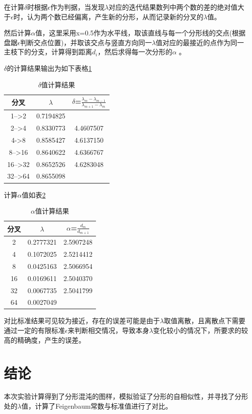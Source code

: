 \documentclass{article}
\begin{document}
	在计算$\delta$时根据$\epsilon$作为判据，当发现$\lambda$对应的迭代结果数列中两个数的差的绝对值大于$\epsilon$时，认为两个数已经偏离，产生新的分形，从而记录新的分叉的$\lambda$值。
	
	
	然后计算$\alpha$值，这里采用x=0.5作为水平线，取该直线与每一个分形线的交点(根据盘踞$ \epsilon $判断交点位置)，并取该交点与竖直方向同一$\lambda$值对应的最接近的点作为同一主枝下的分支，计算得到距离$ d_i $，然后求得每一次分形的$\alpha$ 。
	
	
	$ \delta $的计算结果输出为如下表格\ref{tab:1}
	\begin{table}[!h]
		\centering
		\caption{\heiti{}$\delta$值计算结果}
		\begin{tabular}{ccc}
			\toprule
			分叉&$\lambda$&$\delta$=$\frac{\lambda_m-\lambda_{m-1}}{\lambda_{m+1}-\lambda_m}$\\
			\midrule
			1-->2& 0.7194825&\\
			2-->4& 0.8330773&4.4607507\\
			4->8 &     0.8585427     &           4.6137150\\
			 8-->16 &     0.8640622    &            4.6366767\\
			16-->32   &   0.8652526     &           4.6283048\\
			  32-->64  &    0.8655098&\\
			\bottomrule
		\end{tabular}
	\label{tab:1}
	\end{table}


计算$ \alpha $值如表\ref{tab:2}
	\begin{table}[!h]
	\centering
	\caption{\heiti{}$\alpha$值计算结果}
	\begin{tabular}{ccc}
		\toprule
		分叉&$\lambda$&$\alpha$=$\frac{d_m}{d_{m+1}}$\\
		\midrule
		2&  0.2777321          &      2.5907248\\
		4&  0.1072025          &      2.5214412\\
		8 &     0.0425163      &          2.5066954\\
		16   &   0.0169611      &          2.5040370\\
		32  &     0.0067735         &       2.5041799\\
		  64   &   0.0027049&\\
		\bottomrule
	\end{tabular}
	\label{tab:2}
\end{table}


对比标准结果可见较为接近，存在的误差可能是由于$ \lambda $取值离散，且离散点下需要通过一定的有限标准$\epsilon$来判断相交情况，导致本身$\lambda$变化较小的情况下，所要求的较高的精确度，产生的误差。
\section{结论}
本次实验计算得到了分形混沌的图样，模拟验证了分形的自相似性，并寻找了分形处的$\lambda$值，计算了Feigenbaum常数与标准值进行了对比。
\end{document}
